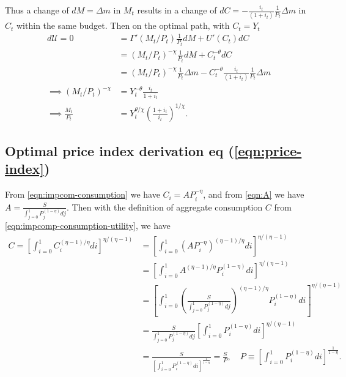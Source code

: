 \documentclass[../main.tex]{subfiles}
\begin{document}
        Thus a change of $dM = \Delta m$ in $M_t$ results in a change of $dC = -\frac{i_t}{(1+i_t)}\frac{1}{P_t} \Delta m$ in $C_t$ within the same budget.
        Then on the optimal path, with $C_t = Y_t$
        \begin{align}
            d \mathcal{U} = 0
            &= \Gamma'(M_t / P_t)\frac{1}{P_t} dM + U'(C_t)dC
            \\
            &= (M_t / P_t)^{-\chi} \frac{1}{P_t} dM + C_t^{-\theta} dC
            \\
            &= (M_t / P_t)^{-\chi} \frac{1}{P_t} \Delta m
            -C_t^{-\theta}
            \frac{i_t}{(1+i_t) }\frac{1}{P_t} \Delta m
            \\
            \implies
            (M_t / P_t)^{-\chi}
            &= Y_t^{-\theta} \frac{i_t}{1+i_t}
            \\
            \implies
            \frac{M_t}{P_t}
            &= Y_t^{\theta/\chi} \left(\frac{1+i_t}{i_t}\right)^{1/\chi}.
        \end{align}
    
    \subsection{Optimal price index derivation eq  (\ref{eqn:price-index})}\label{calc:price-index}
    
        From \eqref{eqn:impcom-consumption} we have $C_i = A P_i^{-\eta}$, and from \eqref{eqn:A} we have $A = \frac{S}{\int_{j=0}^1 P_j^{(1-\eta)} dj}$. Then with the definition of aggregate consumption $C$ from \eqref{eqn:impcomp-consumption-utility}, we have
        \begin{align}
            C = \left[
                    \int_{i=0}^1 C_i^{(\eta - 1)/\eta} di
                \right]^{\eta / (\eta - 1)}
            &= \left[
                \int_{i=0}^1 (A P_i^{-\eta})^{(\eta - 1)/\eta} di
                \right]^{\eta / (\eta - 1)}
            \\
            &= \left[
                \int_{i=0}^1 A^{(\eta - 1)/\eta} P_i^{(1-\eta)} di
                \right]^{\eta / (\eta - 1)}
            \\
            &= \left[
                \int_{i=0}^1
                \left(\frac{S}{\int_{j=0}^1 P_j^{(1-\eta)} dj}\right)^{(\eta - 1)/\eta}
                P_i^{(1-\eta)}
                di
                \right]^{\eta / (\eta - 1)}
            \\
            &= \frac{S}{\int_{j=0}^1 P_j^{(1-\eta)} dj}
                \left[
                \int_{i=0}^1
                P_i^{(1-\eta)}
                di
                \right]^{\eta / (\eta - 1)}
            \\
            &= \frac{S}{
                \left[
                \int_{i=0}^1
                P_i^{(1-\eta)}
                di
                \right]^{\frac{1}{1 - \eta}}
                }
            = \frac{S}{P},
            \quad P \equiv \left[
                \int_{i=0}^1
                P_i^{(1-\eta)}
                di
                \right]^{\frac{1}{1 - \eta}}.
        \end{align}
        
\end{document}
